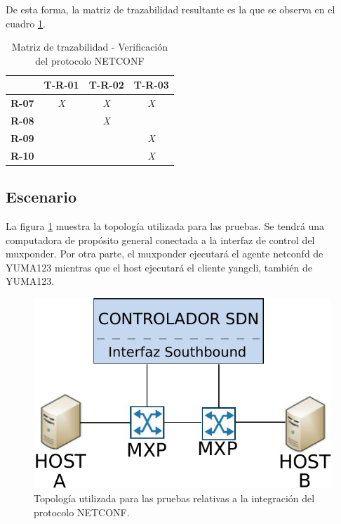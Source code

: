 De esta forma, la matriz de trazabilidad resultante es la que se observa en el cuadro \ref{tab:matriz_netconf}.

\begin{table}[!h]
    \centering
    \begin{tabular}{|c|c|c|c|}
    \hline
                  & \textbf{T-R-01} & \textbf{T-R-02} & \textbf{T-R-03} \\ \hline
    \textbf{R-07} & \textit{X}      & \textit{X}      & \textit{X}      \\ \hline
    \textbf{R-08} & \textit{}       & \textit{X}      & \textit{}       \\ \hline
    \textbf{R-09} & \textit{}       & \textit{}       & \textit{X}      \\ \hline
    \textbf{R-10} & \textit{}       & \textit{}       & \textit{X}      \\ \hline
    \end{tabular}
    \caption{Matriz de trazabilidad - Verificación del protocolo NETCONF}
    \label{tab:matriz_netconf}
\end{table}

\subsection{Escenario}

La figura \ref{fig:test_topo_netconf} muestra la topología utilizada para las pruebas. Se tendrá una computadora de propósito general conectada a la interfaz de control del muxponder. Por otra parte, el muxponder ejecutará el agente netconfd de YUMA123 mientras que el host ejecutará el cliente yangcli, también de YUMA123.

\begin{figure}[!h]
	\centering
	\includegraphics[scale=0.8]{Figures/topologiatest.pdf}
	\caption{Topología utilizada para las pruebas relativas a la integración del protocolo NETCONF.}
	\label{fig:test_topo_netconf}
  \end{figure}


